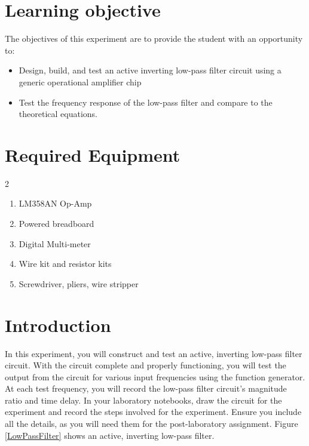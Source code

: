 \documentclass{article} %
\begin{document}


\clearpage



\section{Learning objective}
The objectives of this experiment are to provide the student with an opportunity to:
\begin{itemize}
    \item Design, build, and test an active inverting low-pass filter circuit using a generic operational amplifier chip
    \item Test the frequency response of the low-pass filter and compare to the theoretical equations.
\end{itemize}

\section{Required Equipment}
\begin{multicols}{2}
\begin{enumerate}
    \item LM358AN Op-Amp
    \item Powered breadboard
    \item Digital Multi-meter
    \item Wire kit and resistor kits
    \item Screwdriver, pliers, wire stripper
\end{enumerate}
\end{multicols}

\section{Introduction}
In this experiment, you will construct and test an active, inverting low-pass filter circuit. With the circuit complete and properly functioning, you will test the output from the circuit for various input frequencies using the function generator. At each test frequency, you will record the low-pass filter circuit's magnitude ratio and time delay. In your laboratory notebooks, draw the circuit for the experiment and record the steps involved for the experiment. Ensure you include all the details, as you will need them for the post-laboratory assignment. Figure \ref{LowPassFilter} shows an active, inverting low-pass filter.
\end{document}
